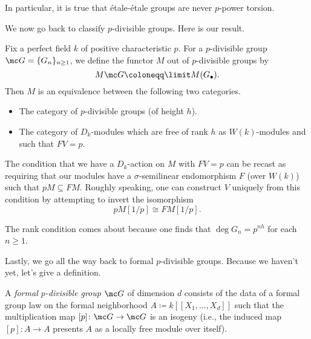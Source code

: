\documentclass[../notes.tex]{subfiles}
\begin{document}
\begin{remark}
	In particular, it is true that \'etale-\'etale groups are never $p$-power torsion.
\end{remark}
We now go back to classify $p$-divisible groups. Here is our result.
\begin{theorem}
	Fix a perfect field $k$ of positive characteristic $p$. For a $p$-divisible group $\mc G=\{G_n\}_{n\ge1}$, we define the functor $M$ out of $p$-divisible groups by
	\[M\mc G\coloneqq\limit M(G_\bullet).\]
	Then $M$ is an equivalence between the following two categories.
	\begin{itemize}
		\item The category of $p$-divisible groups (of height $h$).
		\item The category of $D_k$-modules which are free of rank $h$ as $W(k)$-modules and such that $FV=p$.
	\end{itemize}
\end{theorem}
\begin{remark}
	The condition that we have a $D_k$-action on $M$ with $FV=p$ can be recast as requiring that our modules have a $\sigma$-semilinear endomorphism $F$ (over $W(k)$) such that $pM\subseteq FM$. Roughly speaking, one can construct $V$ uniquely from this condition by attempting to invert the isomorphism
	\[pM[1/p]\cong FM[1/p].\]
\end{remark}
\begin{remark}
	The rank condition comes about because one finds that $\deg G_n=p^{nh}$ for each $n\ge1$.
\end{remark}
Lastly, we go all the way back to formal $p$-divisible groups. Because we haven't yet, let's give a definition.
\begin{definition}
	A \textit{formal $p$-divisible group} $\mc G$ of dimension $d$ consists of the data of a formal group law on the formal neighborhood $A\coloneqq k[[X_1,\ldots,X_d]]$ such that the multiplication map $[p]\colon\mc G\to\mc G$ is an isogeny (i.e., the induced map $[p]\colon A\to A$ presents $A$ as a locally free module over itself).
\end{definition}
\end{document}
